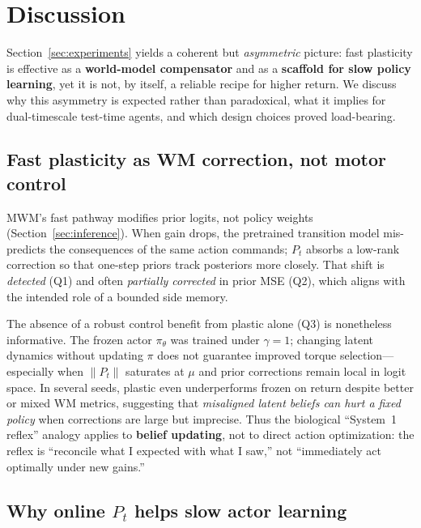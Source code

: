 % 

\section{Discussion}
\label{sec:discussion}

Section~\ref{sec:experiments} yields a coherent but \emph{asymmetric} picture: fast plasticity is effective as a \textbf{world-model compensator} and as a \textbf{scaffold for slow policy learning}, yet it is not, by itself, a reliable recipe for higher return.
We discuss why this asymmetry is expected rather than paradoxical, what it implies for dual-timescale test-time agents, and which design choices proved load-bearing.

\subsection{Fast plasticity as WM correction, not motor control}
\label{sec:disc-fast}

MWM's fast pathway modifies prior logits, not policy weights (Section~\ref{sec:inference}).
When gain drops, the pretrained transition model mis-predicts the consequences of the same action commands; $P_t$ absorbs a low-rank correction so that one-step priors track posteriors more closely.
That shift is \emph{detected} (Q1) and often \emph{partially corrected} in prior MSE (Q2), which aligns with the intended role of a bounded side memory.

The absence of a robust control benefit from plastic alone (Q3) is nonetheless informative.
The frozen actor $\pi_\theta$ was trained under $\gamma=1$; changing latent dynamics without updating $\pi$ does not guarantee improved torque selection---especially when $\|P_t\|$ saturates at $\mu$ and prior corrections remain local in logit space.
In several seeds, plastic even underperforms frozen on return despite better or mixed WM metrics, suggesting that \emph{misaligned latent beliefs can hurt a fixed policy} when corrections are large but imprecise.
Thus the biological ``System~1 reflex'' analogy applies to \textbf{belief updating}, not to direct action optimization: the reflex is ``reconcile what I expected with what I saw,'' not ``immediately act optimally under new gains.''

\subsection{Why online $P_t$ helps slow actor learning}
\label{sec:disc-scaffold}


